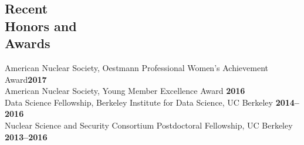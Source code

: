 \documentclass[margin,line]{resume}
\begin{document}
\begin{resume}
    \section{\mysidestyle Recent\\Honors and\\Awards}
                American Nuclear Society, Oestmann Professional Women's Achievement Award\hfill \textbf{2017}\vspace{.5mm}\\%
                American Nuclear Society, Young Member Excellence Award                         \hfill \textbf{2016}\vspace{.5mm}\\%
                Data Science Fellowship, Berkeley Institute for Data Science, UC Berkeley     \hfill \textbf{2014--2016}\vspace{.5mm}\\%
                Nuclear Science and Security Consortium Postdoctoral Fellowship, UC Berkeley  \hfill \textbf{2013--2016}\vspace{.5mm}\\%

\end{resume}
\end{document}
